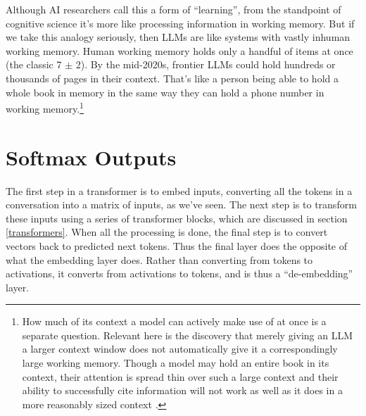 Although AI researchers call this a form of ``learning'', from the standpoint of cognitive science it's more like processing information in working memory. But if we take this analogy seriously, then LLMs are like systems with vastly inhuman working memory.  Human working memory holds only a handful of items at once (the
classic 7 $\pm$ 2). By the mid-2020s, frontier LLMs could hold hundreds or thousands of pages in their context. That's like a person being able to hold a whole book in memory in the same way they can hold a phone number in working memory.\footnote{How much
of its context a model can actively make use of at once is a separate
question. Relevant here is the discovery that merely giving an LLM a larger
context window does not automatically give it a correspondingly large working
memory. Though a model may hold an entire book in its context,
their attention is spread thin over such a large context and their ability to
successfully cite information will not work as well as it does in a more
reasonably sized context \cite{liu2024lost}.}

\section{Softmax Outputs}\label{llmOutput}

The first step in a transformer is to embed inputs, converting all the tokens in a conversation into a matrix of inputs, as we've seen. The next step is to transform these inputs using a series of transformer blocks, which are discussed in section \ref{transformers}. When all the processing is done, the final step is to convert vectors back to predicted next tokens. Thus the final
 layer does the opposite of what the embedding layer does. Rather than converting from tokens to activations, it converts from activations to tokens, and is thus a ``de-embedding'' layer.

